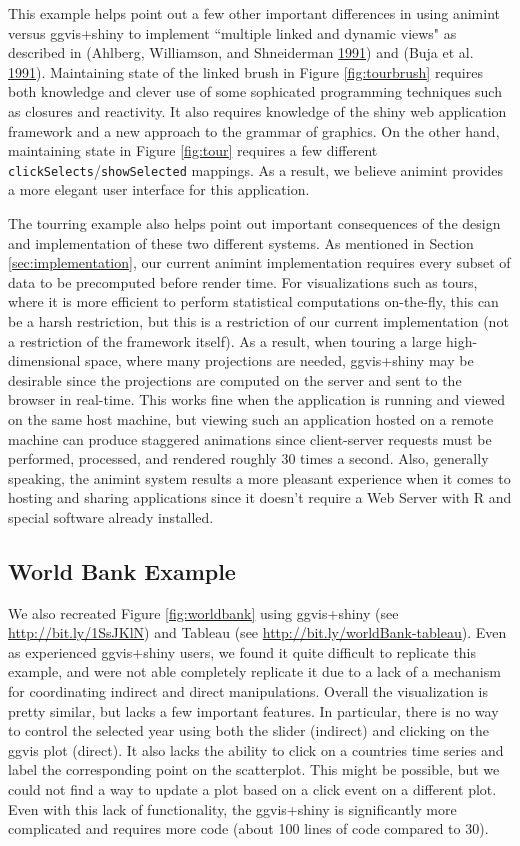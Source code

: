 \documentclass[12pt,]{isuthesis}
\begin{document}
This example helps point out a few other important differences in using
animint versus ggvis+shiny to implement ``multiple linked and dynamic
views" as described in (Ahlberg, Williamson, and Shneiderman
\protect\hyperlink{ref-Ahlberg:1991}{1991}) and (Buja et al.
\protect\hyperlink{ref-Buja:1991vh}{1991}). Maintaining state of the
linked brush in Figure \ref{fig:tourbrush} requires both knowledge and
clever use of some sophicated programming techniques such as closures
and reactivity. It also requires knowledge of the shiny web application
framework and a new approach to the grammar of graphics. On the other
hand, maintaining state in Figure \ref{fig:tour} requires a few
different \texttt{clickSelects}/\texttt{showSelected} mappings. As a
result, we believe animint provides a more elegant user interface for
this application.

The tourring example also helps point out important consequences of the
design and implementation of these two different systems. As mentioned
in Section \ref{sec:implementation}, our current animint implementation
requires every subset of data to be precomputed before render time. For
visualizations such as tours, where it is more efficient to perform
statistical computations on-the-fly, this can be a harsh restriction,
but this is a restriction of our current implementation (not a
restriction of the framework itself). As a result, when touring a large
high-dimensional space, where many projections are needed, ggvis+shiny
may be desirable since the projections are computed on the server and
sent to the browser in real-time. This works fine when the application
is running and viewed on the same host machine, but viewing such an
application hosted on a remote machine can produce staggered animations
since client-server requests must be performed, processed, and rendered
roughly 30 times a second. Also, generally speaking, the animint system
results a more pleasant experience when it comes to hosting and sharing
applications since it doesn't require a Web Server with R and special
software already installed.

\subsection{World Bank Example}

We also recreated Figure \ref{fig:worldbank} using ggvis+shiny (see
\url{http://bit.ly/1SsJKlN}) and Tableau (see
\url{http://bit.ly/worldBank-tableau}). Even as experienced ggvis+shiny
users, we found it quite difficult to replicate this example, and were
not able completely replicate it due to a lack of a mechanism for
coordinating indirect and direct manipulations. Overall the
visualization is pretty similar, but lacks a few important features. In
particular, there is no way to control the selected year using both the
slider (indirect) and clicking on the ggvis plot (direct). It also lacks
the ability to click on a countries time series and label the
corresponding point on the scatterplot. This might be possible, but we
could not find a way to update a plot based on a click event on a
different plot. Even with this lack of functionality, the ggvis+shiny is
significantly more complicated and requires more code (about 100 lines
of code compared to 30).
\end{document}
